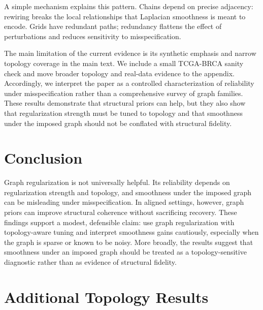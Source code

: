 \documentclass[10pt,twocolumn,letterpaper]{article}
\theoremstyle{definition}
\begin{document}
A simple mechanism explains this pattern. Chains depend on precise adjacency: rewiring breaks the local relationships that Laplacian smoothness is meant to encode. Grids have redundant paths; redundancy flattens the effect of perturbations and reduces sensitivity to misspecification.

The main limitation of the current evidence is its synthetic emphasis and narrow topology coverage in the main text. We include a small TCGA-BRCA sanity check and move broader topology and real-data evidence to the appendix. Accordingly, we interpret the paper as a controlled characterization of reliability under misspecification rather than a comprehensive survey of graph families. These results demonstrate that structural priors can help, but they also show that regularization strength must be tuned to topology and that smoothness under the imposed graph should not be conflated with structural fidelity.

\section{Conclusion}
\label{sec:conclusion}

Graph regularization is not universally helpful. Its reliability depends on regularization strength and topology, and smoothness under the imposed graph can be misleading under misspecification. In aligned settings, however, graph priors can improve structural coherence without sacrificing recovery. These findings support a modest, defensible claim: use graph regularization with topology-aware tuning and interpret smoothness gains cautiously, especially when the graph is sparse or known to be noisy. More broadly, the results suggest that smoothness under an imposed graph should be treated as a topology-sensitive diagnostic rather than as evidence of structural fidelity.

\appendix

\section{Additional Topology Results}
\label{app:topology}
\end{document}
